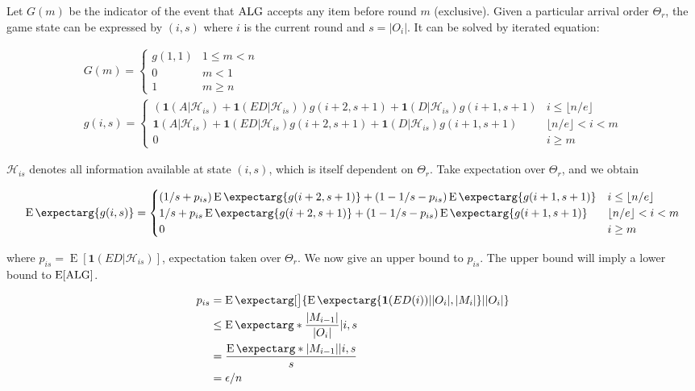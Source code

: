 \documentclass{article}
\newcommand{\expec}{\operatorname{E}}
\newcommand{\lt}{<}
\newcommand{\card}[1]{\lvert #1 \rvert}
\newcommand{\expect}{\operatorname{E}\expectarg}
\begin{document}
Let $G(m)$ be the indicator of the event that $\text{ALG}$ accepts any item before round $m$ (exclusive). Given a particular arrival order $\Theta_r$, the game state can be expressed by $(i,s)$ where $i$ is the current round and $s = |O_i|$. It can be solved by iterated equation:

\begin{gather*}
G(m) = \begin{cases}
g(1, 1) & 1\leq m\lt n\\
0 & m < 1\\
1 & m \geq n
\end{cases}\\
g(i,s) = \begin{cases}
(\mathbf{1}(A|\mathcal{H}_{is}) + 
\mathbf{1}(ED|\mathcal{H}_{is}))g(i+2, s+1) + 
\mathbf{1}(D|\mathcal{H}_{is})g(i+1,s+1) & i\leq\lfloor n/e \rfloor\\
\mathbf{1}(A|\mathcal{H}_{is}) + 
\mathbf{1}(ED|\mathcal{H}_{is})g(i+2, s+1) + 
\mathbf{1}(D|\mathcal{H}_{is})g(i+1,s+1) & \lfloor n/e \rfloor<i<m\\
0 & i \geq m
\end{cases}
\end{gather*}

$\mathcal{H}_{is}$ denotes all information available at state $(i,s)$, which is itself dependent on $\Theta_r$.
Take expectation over $\Theta_r$, and we obtain

\begin{equation*}
\expect{g(i,s)} = \begin{cases}
(1/s + 
p_{is})\expect{g(i+2, s+1)} + 
(1-1/s-p_{is})\expect{g(i+1,s+1)} & i\leq\lfloor n/e \rfloor\\

1/s + 
p_{is}\expect{g(i+2, s+1)} + 
(1-1/s-p_{is})\expect{g(i+1,s+1)} & \lfloor n/e \rfloor<i<m\\

0 & i \geq m
\end{cases}
\end{equation*}

where $p_{is} = \expec[\mathbf{1}(ED|\mathcal{H}_{is})]$, expectation taken over $\Theta_r$. We now give an upper bound to $p_{is}$. The upper bound will imply a lower bound to $\expec[\ALG]$.

\begin{align*}
p_{is} &= \expect[\big]{\expect{\mathbf{1}(ED(i)) |  \card{O_i}, \card{M_i}} | \card{O_i}}
\\&\leq \expect*{\frac{\card{M_{i-1}}}{\card{O_{i}} }| i,s}
\\&= \frac{\expect*{\card{M_{i-1}}|i,s}}{s}
\\&= \epsilon/n
\end{align*}
\end{document}
